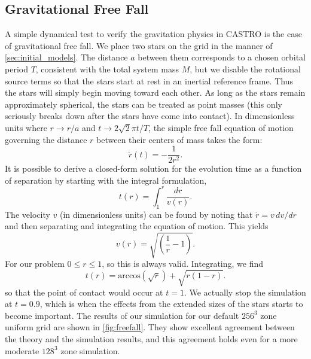 \documentclass[iop]{../emulateapj}
\begin{document}
\subsection{Gravitational Free Fall}\label{sec:Gravitational Free Fall}

A simple dynamical test to verify the gravitation physics in CASTRO is
the case of gravitational free fall. We place two stars on the grid 
in the manner of \autoref{sec:initial_models}. The distance $a$ between 
them corresponds to a chosen orbital period $T$, consistent with the total
system mass $M$, but we disable the rotational source terms so that 
the stars start at rest in an inertial reference frame. 
Thus the stars will simply begin moving toward each other.
As long as the stars remain approximately spherical, the stars can be 
treated as point masses (this only seriously breaks down after the stars
have come into contact). In dimensionless units where $r \to r / a$ and 
$t \to 2\sqrt{2}\pi t / T$, the simple free fall equation of motion governing the
distance $r$ between their centers of mass takes the form:
\begin{equation}
  \ddot{r}(t) = - \frac{1}{2r^2}.
\end{equation}
It is possible to derive a closed-form solution for the evolution time
as a function of separation by starting with the integral formulation,
\begin{equation}
  t(r) = \int_{1}^{r} \frac{dr}{v(r)}.
\end{equation}
The velocity $v$ (in dimensionless units) can be found by noting that 
$\ddot{r} = v\, dv / dr$ and then separating and integrating the equation 
of motion. This yields 
\begin{equation}
  v(r) = \sqrt{\left(\frac{1}{r} - 1\right)}.
\end{equation}
For our problem $0 \leq r \leq 1$, so this is always valid. Integrating, we find
\begin{equation}
  t(r) = \text{arccos}\left(\sqrt{r}\right) + \sqrt{r \left(1 - r\right)}. \label{analyticalFreeFall}
\end{equation}
so that the point of contact would occur at $t = 1$. We actually stop the simulation
at $t = 0.9$, which is when the effects from the extended sizes of the stars
starts to become important. The results of our simulation for our default $256^3$ zone 
uniform grid are shown in \autoref{fig:freefall}. They show excellent agreement
between the theory and the simulation results, and this agreement holds even for 
a more moderate $128^3$ zone simulation.
\end{document}
